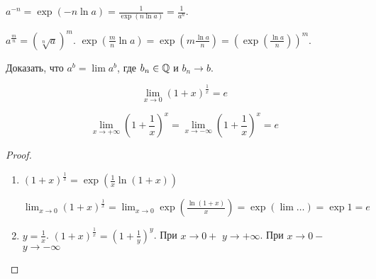 $a^{-n} = \exp(-n \ln a) = \frac{1}{\exp(n \ln a)} = \frac{1}{a^n}$.

$a^{\frac{m}{n}} = (\sqrt[n]{a})^m$. $\exp(\frac{m}{n} \ln a) = \exp(m \frac{\ln a}{n}) = (\exp(\frac{\ln a}{n}))^m$.

\begin{exerc}
    Доказать, что $a^b = \lim a^b$, где  $b_n \in \mathbb{Q}$ и  $b_n \to b$.
\end{exerc}

\begin{consequence}
    \begin{equation}
         \lim_{x\to 0} (1+x)^{\frac{1}{x}} = e
     \end{equation}

    \begin{equation}
        \lim_{x\to +\infty} (1+\frac{1}{x})^{x} = \lim_{x\to -\infty} (1+\frac{1}{x})^{x} = e
     \end{equation}
\end{consequence}
\begin{proof}
    \begin{enumerate}
        \item $(1+x)^{\frac{1}{x}} = \exp(\frac{1}{x} \ln(1+x))$ 

            $\lim_{x\to 0}(1+x)^{\frac{1}{x}} = \lim_{x \to 0} \exp(\frac{\ln(1+x)}{x}) = \exp(\lim \ldots) = \exp 1 = e$ 
        \item $y = \frac{1}{x}$. $(1+x)^{\frac{1}{x}} = (1 + \frac{1}{y})^y$. При $x \to 0+$  $y \to +\infty$. При  $x \to 0-$  $y \to -\infty$
    \end{enumerate}
\end{proof}

